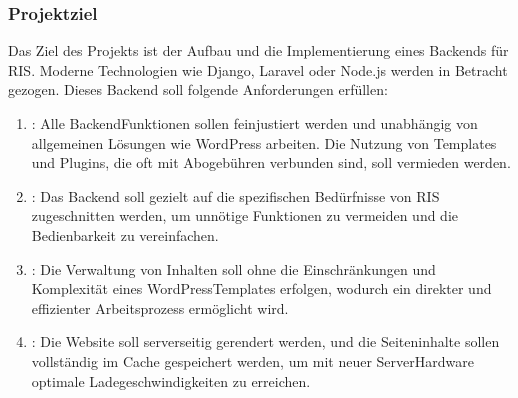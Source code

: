 \documentclass[a4paper,12pt,ngerman]{sphinxmanual}
\begin{document}
\subsubsection{Projektziel}
\label{\detokenize{sections/projektplanung_analyse:projektziel}}
\sphinxAtStartPar
Das Ziel des Projekts ist der Aufbau und die Implementierung eines Backends für RIS. Moderne Technologien wie Django, Laravel oder Node.js werden in Betracht gezogen. Dieses Backend soll folgende Anforderungen erfüllen:
\begin{enumerate}
%
\item {} 
\sphinxAtStartPar
{}:
\sphinxhyphen{} Alle Backend\sphinxhyphen{}Funktionen sollen feinjustiert werden und unabhängig von allgemeinen Lösungen wie WordPress arbeiten.
\sphinxhyphen{} Die Nutzung von Templates und Plugins, die oft mit Abogebühren verbunden sind, soll vermieden werden.

\item {} 
\sphinxAtStartPar
{}:
\sphinxhyphen{} Das Backend soll gezielt auf die spezifischen Bedürfnisse von RIS zugeschnitten werden, um unnötige Funktionen zu vermeiden und die Bedienbarkeit zu vereinfachen.

\item {} 
\sphinxAtStartPar
{}:
\sphinxhyphen{} Die Verwaltung von Inhalten soll ohne die Einschränkungen und Komplexität eines WordPress\sphinxhyphen{}Templates erfolgen, wodurch ein direkter und effizienter Arbeitsprozess ermöglicht wird.

\item {} 
\sphinxAtStartPar
{}:
\sphinxhyphen{} Die Website soll serverseitig gerendert werden, und die Seiteninhalte sollen vollständig im Cache gespeichert werden, um mit neuer Server\sphinxhyphen{}Hardware optimale Ladegeschwindigkeiten zu erreichen.

\end{enumerate}
\end{document}

